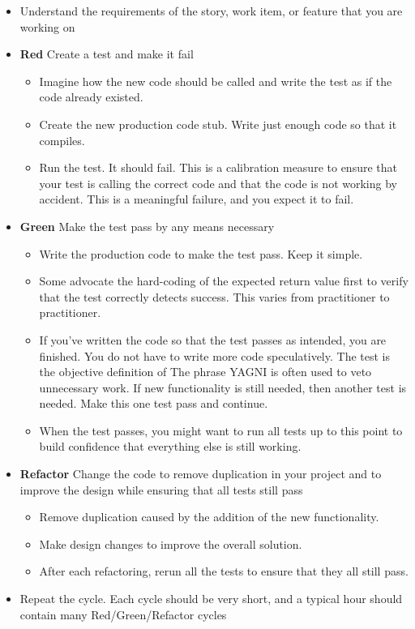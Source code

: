 	\begin{itemize}
		\item Understand the requirements of the story, work item, or feature that you are working on
		\item \textbf{Red} Create a test and make it fail
		\begin{itemize}
			\item Imagine how the new code should be called and write the test as if the code already existed.
			\item Create the new production code stub. Write just enough code so that it compiles.
			\item Run the test. It should fail. This is a calibration measure to ensure that your test is calling the correct
			code and that the code is not working by accident. This is a meaningful failure, and you expect it to fail.
		\end{itemize}
		\item \textbf{Green} Make the test pass by any means necessary
		\begin{itemize}
			\item Write the production code to make the test pass. Keep it simple.
			\item Some advocate the hard-coding of the expected return value first to verify that the test correctly detects
			success. This varies from practitioner to practitioner.
			\item If you've written the code so that the test passes as intended, you are finished. You do not have to write more
			code speculatively. The test is the objective definition of  The phrase \gls{YAGNI} is often used to veto
			unnecessary work. If new functionality is still needed, then another test is needed. Make this one test pass and
			continue.
			\item When the test passes, you might want to run all tests up to this point to build confidence that everything else
			is still working.
		\end{itemize}
		\item \textbf{Refactor} Change the code to remove duplication in your project and to improve the design while ensuring
		that all tests still pass
		\begin{itemize}
			\item Remove duplication caused by the addition of the new functionality.
			\item Make design changes to improve the overall solution.
			\item After each refactoring, rerun all the tests to ensure that they all still pass.
		\end{itemize}
		\item Repeat the cycle. Each cycle should be very short, and a typical hour should contain many Red/Green/Refactor
		cycles
	\end{itemize}
	
